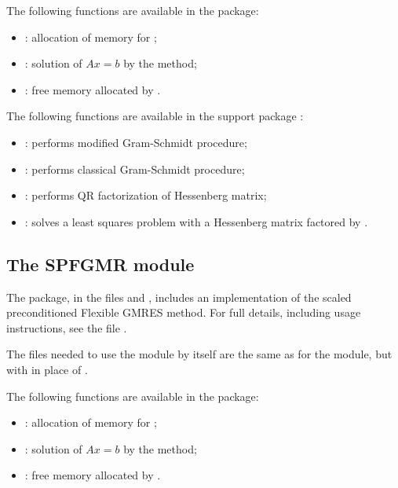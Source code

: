 The following functions are available in the {\spgmr} package:  
\begin{itemize}
\item {}: allocation of memory for ;
\item {}: solution of $Ax = b$ by the {\spgmr} method;
\item {}: free memory allocated by .
\end{itemize}
%
The following functions are available in the support package 
:
\begin{itemize}
\item {}: performs modified Gram-Schmidt procedure;
\item {}: performs classical Gram-Schmidt procedure; 
\item {}: performs QR factorization of Hessenberg matrix;
\item {}: solves a least squares problem with a Hessenberg
       matrix factored by .
\end{itemize}


\subsection{The SPFGMR module}\label{ss:spfgmr}

The {\spfgmr} package, in the files  and
, includes an implementation of the scaled
preconditioned Flexible GMRES method.
For full details, including usage instructions, see the file .

The files needed to use the {\spfgmr} module by itself are the same as for the
{\spgmr} module, but with  in place of
.

The following functions are available in the {\spfgmr} package:  
\begin{itemize}
\item {}: allocation of memory for ;
\item {}: solution of $Ax = b$ by the {\spfgmr} method;
\item {}: free memory allocated by .
\end{itemize}


